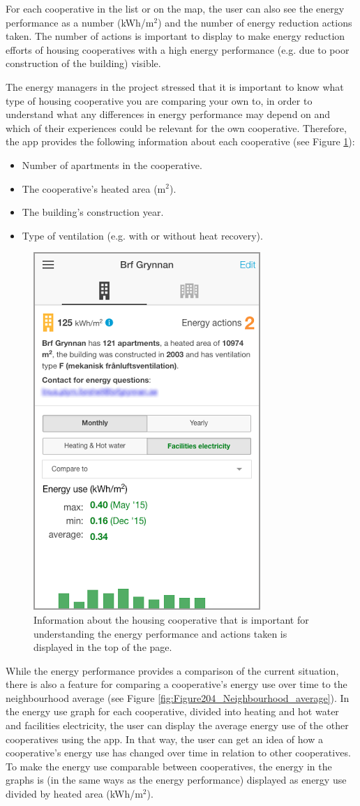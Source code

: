 For each cooperative in the list or on the map, the user can also see the energy performance as a number (kWh/m$^2$) and the number of energy reduction actions taken. The number of actions is important to display to make energy reduction efforts of housing cooperatives with a high energy performance (e.g. due to poor construction of the building) visible. 

The energy managers in the project stressed that it is important to know what type of housing cooperative you are comparing your own to, in order to understand what any differences in energy performance may depend on and which of their experiences could be relevant for the own cooperative. Therefore, the app provides the following information about each cooperative (see Figure \ref{fig:Figure203_cooperative_info}):
\begin{itemize}
\item Number of apartments in the cooperative.
\item The cooperative's heated area (m$^2$).
\item The building's construction year.
\item Type of ventilation (e.g. with or without heat recovery).
\end{itemize}

\begin{figure}
	\centering
	\includegraphics[width=0.4\linewidth]{img/Figure203_cooperative_info.png}
	\caption{Information about the housing cooperative that is important for understanding the energy performance and actions taken is displayed in the top of the page.}
	\label{fig:Figure203_cooperative_info}
\end{figure}

While the energy performance provides a comparison of the current situation, there is also a feature for comparing a cooperative's energy use over time to the neighbourhood average (see Figure \ref{fig:Figure204_Neighbourhood_average}). In the energy use graph for each cooperative, divided into heating and hot water and facilities electricity, the user can display the average energy use of the other cooperatives using the app. In that way, the user can get an idea of how a cooperative's energy use has changed over time in relation to other cooperatives. To make the energy use comparable between cooperatives, the energy in the graphs is (in the same ways as the energy performance) displayed as energy use divided by heated area (kWh/m$^2$).

